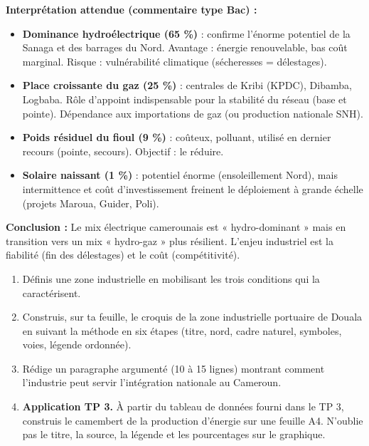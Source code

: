 \documentclass[11pt]{article}
\begin{document}
\begin{experience}
\textbf{Interprétation attendue (commentaire type Bac) :}
\begin{itemize}
\item \textbf{Dominance hydroélectrique (65 \%)} : confirme l'énorme potentiel de la Sanaga et des barrages du Nord. Avantage : énergie renouvelable, bas coût marginal. Risque : vulnérabilité climatique (sécheresses = délestages).
\item \textbf{Place croissante du gaz (25 \%)} : centrales de Kribi (KPDC), Dibamba, Logbaba. Rôle d'appoint indispensable pour la stabilité du réseau (base et pointe). Dépendance aux importations de gaz (ou production nationale SNH).
\item \textbf{Poids résiduel du fioul (9 \%)} : coûteux, polluant, utilisé en dernier recours (pointe, secours). Objectif : le réduire.
\item \textbf{Solaire naissant (1 \%)} : potentiel énorme (ensoleillement Nord), mais intermittence et coût d'investissement freinent le déploiement à grande échelle (projets Maroua, Guider, Poli).
\end{itemize}
\textbf{Conclusion :} Le mix électrique camerounais est « hydro-dominant » mais en transition vers un mix « hydro-gaz » plus résilient. L'enjeu industriel est la fiabilité (fin des délestages) et le coût (compétitivité).
\end{experience}

\begin{exercice}
\begin{enumerate}
\item Définis une zone industrielle en mobilisant les trois conditions qui la caractérisent.
\item Construis, sur ta feuille, le croquis de la zone industrielle portuaire de Douala en suivant la méthode en six étapes (titre, nord, cadre naturel, symboles, voies, légende ordonnée).
\item Rédige un paragraphe argumenté (10 à 15 lignes) montrant comment l'industrie peut servir l'intégration nationale au Cameroun.
\item \textbf{Application TP 3.} À partir du tableau de données fourni dans le TP 3, construis le camembert de la production d'énergie sur une feuille A4. N'oublie pas le titre, la source, la légende et les pourcentages sur le graphique.
\end{enumerate}
\end{exercice}
\end{document}
